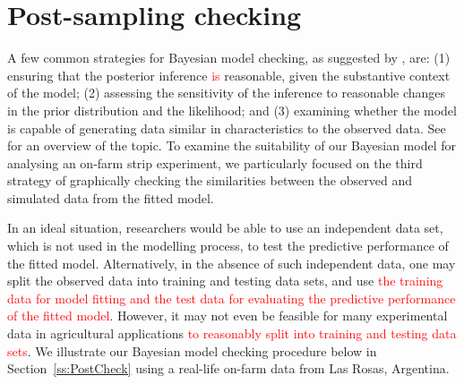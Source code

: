 \documentclass[a4paper]{article}   	%
\begin{document}
	
	
	
	\section{Post-sampling checking}\label{sec:mcmcchain}
	
	
	
	A few common strategies for Bayesian model checking, as suggested by \textcite{gelman2003Bayesian}, are: (1) ensuring that the posterior inference \textcolor{red}{is} reasonable, given the substantive context of the model; (2) assessing the sensitivity of the inference to reasonable changes in the prior distribution and the likelihood; and (3) examining whether the model is capable of generating data similar in characteristics to the observed data. See \textcite{gelman2004Exploratory, Weiss1994Pediatric, Gelman2013Bayesian, Congdon2019Bayesian} for an overview of the topic. To examine the suitability of our Bayesian model for analysing an on-farm strip experiment, we particularly focused on the third strategy of graphically checking the similarities between the observed and simulated data from the fitted model. 
	
	
	In an ideal situation, researchers would be able to use an independent data set, which is not used in the modelling process, to test the predictive performance of the fitted model. Alternatively, in the absence of such independent data, one may split the observed data into training and testing data sets, and use \textcolor{red}{the training data for model fitting and the test data for evaluating the predictive performance of the fitted model}. However, it may not even be feasible for many experimental data in agricultural applications \textcolor{red}{to reasonably split into training and testing data sets}. We illustrate our Bayesian model checking procedure below in Section~\ref{ss:PostCheck} using a real-life on-farm data from Las Rosas, Argentina. 
	
\end{document}
